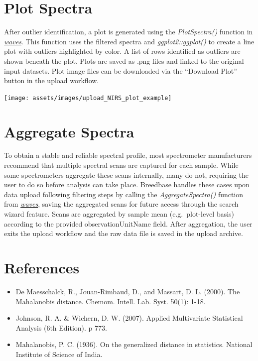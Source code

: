 \documentclass[
  12pt,
]{book}
\providecommand{\tightlist}{%
  \setlength{\itemsep}{0pt}\setlength{\parskip}{0pt}}
\begin{document}
\hypertarget{plot-spectra}{%
\section{Plot Spectra}\label{plot-spectra}}

After outlier identification, a plot is generated using the \emph{PlotSpectra()} function in \href{https://CRAN.R-project.org/package=waves}{\emph{waves}}. This function uses the filtered spectra and \emph{ggplot2::ggplot()} to create a line plot with outliers highlighted by color. A list of rows identified as outliers are shown beneath the plot. Plots are saved as .png files and linked to the original input datasets. Plot image files can be downloaded via the ``Download Plot'' button in the upload workflow.

\begin{center}\texttt{[image: assets/images/upload\_NIRS\_plot\_example]} \end{center}

\hypertarget{aggregate-spectra}{%
\section{Aggregate Spectra}\label{aggregate-spectra}}

To obtain a stable and reliable spectral profile, most spectrometer manufacturers recommend that multiple spectral scans are captured for each sample. While some spectrometers aggregate these scans internally, many do not, requiring the user to do so before analysis can take place. Breedbase handles these cases upon data upload following filtering steps by calling the \emph{AggregateSpectra()} function from \href{https://CRAN.R-project.org/package=waves}{\emph{waves}}, saving the aggregated scans for future access through the search wizard feature. Scans are aggregated by sample mean (e.g.~plot-level basis) according to the provided observationUnitName field. After aggregation, the user exits the upload workflow and the raw data file is saved in the upload archive.

\hypertarget{references}{%
\section{References}\label{references}}

\begin{itemize}
\tightlist
\item
  De Maesschalck, R., Jouan-Rimbaud, D., and Massart, D. L. (2000). The Mahalanobis distance. Chemom. Intell. Lab. Syst. 50(1): 1-18.
\item
  Johnson, R. A. \& Wichern, D. W. (2007). Applied Multivariate Statistical Analysis (6th Edition). p 773.
\item
  Mahalanobis, P. C. (1936). On the generalized distance in statistics. National Institute of Science of India.
\end{itemize}
\end{document}
